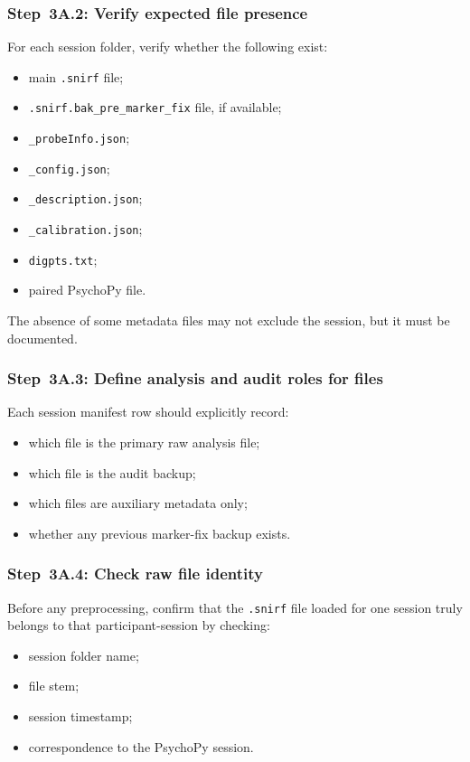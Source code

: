 \subsubsection{Step~3A.2: Verify expected file presence}
For each session folder, verify whether the following exist:
\begin{itemize}
    \item main \texttt{.snirf} file;
    \item \texttt{.snirf.bak\_pre\_marker\_fix} file, if available;
    \item \texttt{\_probeInfo.json};
    \item \texttt{\_config.json};
    \item \texttt{\_description.json};
    \item \texttt{\_calibration.json};
    \item \texttt{digpts.txt};
    \item paired PsychoPy file.
\end{itemize}

The absence of some metadata files may not exclude the session, but it must be documented.

\subsubsection{Step~3A.3: Define analysis and audit roles for files}
Each session manifest row should explicitly record:
\begin{itemize}
    \item which file is the primary raw analysis file;
    \item which file is the audit backup;
    \item which files are auxiliary metadata only;
    \item whether any previous marker-fix backup exists.
\end{itemize}

\subsubsection{Step~3A.4: Check raw file identity}
Before any preprocessing, confirm that the \texttt{.snirf} file loaded for one session truly belongs
to that participant-session by checking:
\begin{itemize}
    \item session folder name;
    \item file stem;
    \item session timestamp;
    \item correspondence to the PsychoPy session.
\end{itemize}


